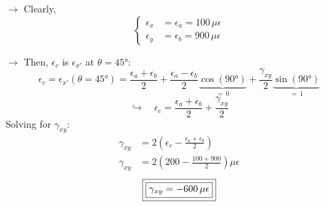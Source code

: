 \documentclass[11pt]{article}
\begin{document}
\bigskip
\noindent
$\rightarrow$ Clearly,
\[
  \left\{
  \begin{aligned}
    \epsilon_x &= \epsilon_a = 100\,\mu\epsilon \\
    \epsilon_y &= \epsilon_b = 900\,\mu\epsilon
  \end{aligned}
  \right.
\]

\noindent
$\rightarrow$ Then, $\epsilon_c$ is $\epsilon_{x'}$ at $\theta = \ang{45}$:
\[
  \epsilon_c = \epsilon_{x'}(\theta = \ang{45})
  = \frac{\epsilon_a + \epsilon_b}{2}
    + \frac{\epsilon_a - \epsilon_b}{2}\underbrace{\cos(\ang{90})}_{=\,0}
    + \frac{\gamma_{xy}}{2}\underbrace{\sin(\ang{90})}_{=\,1}
\]
\[
  \hookrightarrow\quad
  \epsilon_c = \frac{\epsilon_a + \epsilon_b}{2} + \frac{\gamma_{xy}}{2}
\]
Solving for $\gamma_{xy}$:
\begin{align*}
  \gamma_{xy} &= 2\left(\epsilon_c - \frac{\epsilon_a + \epsilon_b}{2}\right) \\
  \gamma_{xy} &= 2\left(200 - \frac{100 + 900}{2}\right)\mu\epsilon
\end{align*}
\[
  \fbox{\fbox{$\gamma_{xy} = -600\,\mu\epsilon$}}
\]
\end{document}
